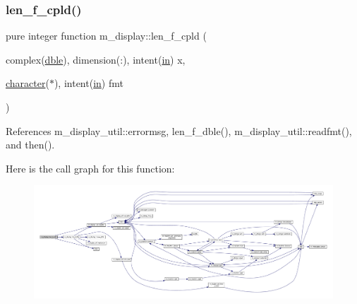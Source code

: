\subsubsection{\texorpdfstring{len\+\_\+f\+\_\+cpld()}{len\_f\_cpld()}}
{\footnotesize\ttfamily pure integer function m\+\_\+display\+::len\+\_\+f\+\_\+cpld (\begin{DoxyParamCaption}\item[{complex(\hyperlink{namespacem__display_a46d90b75b6ccef7ccade133e5847e815}{dble}), dimension(\+:), intent(\hyperlink{M__journal_83_8txt_afce72651d1eed785a2132bee863b2f38}{in})}]{x,  }\item[{\hyperlink{option__stopwatch_83_8txt_abd4b21fbbd175834027b5224bfe97e66}{character}($\ast$), intent(\hyperlink{M__journal_83_8txt_afce72651d1eed785a2132bee863b2f38}{in})}]{fmt }\end{DoxyParamCaption})\hspace{0.3cm}{\ttfamily [private]}}



References m\+\_\+display\+\_\+util\+::errormsg, len\+\_\+f\+\_\+dble(), m\+\_\+display\+\_\+util\+::readfmt(), and then().

Here is the call graph for this function\+:
\nopagebreak
\begin{figure}[H]
\begin{center}
\leavevmode
\includegraphics[width=350pt]{namespacem__display_a803611d2a793f2a4aa7563b6c8295cb3_cgraph}
\end{center}
\end{figure}
\mbox{\label{namespacem__display_a37f268a7276f14d4975200a8f83acff3}} 
